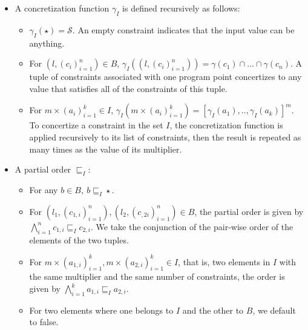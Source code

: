 \documentclass[10pt]{report}
\begin{document}
\begin{itemize}
	\item A concretization function $ \gamma_{I} $ is defined recursively as follows:
		\begin{itemize}
			\item $ \gamma_{I}(\star) = \mathcal{S}$. An empty constraint indicates that the input value can be anything. 
			
			\item For $ (l, (c_{i})_{i=1}^{n}) \in B $, $ \gamma_{I}((l, (c_{i})_{i=1}^{n})) = \gamma(c_{1}) \cap ... \cap\gamma(c_{n}) $. A tuple of constraints associated with one program point concertizes to any value that satisfies all of the constraints of this tuple.  
			
			\item For $ m \times (a_{i})_{i=1}^{k} \in I $, $ \gamma_{I}(m \times (a_{i})_{i=1}^{k}) = [\gamma_{I}(a_{1}),.., \gamma_{I}(a_{k})]^{m}$. To concertize a constraint in the set $ I $, the concretization function is applied recursively to its list of constraints, then the result is repeated as many times as the value of its multiplier. 
		\end{itemize}
	\item A partial order $ \sqsubseteq_{I} $:
	\begin{itemize}
		\item For any $ b \in B,\ b \sqsubseteq_{I} \star$. 
		\item For $(l_{1}, (c_{1,i})_{i=1}^{n}), (l_{2}, (c_{,2i})_{i=1}^{n}) \in B$, the partial order is given by $ \bigwedge\limits_{i=1}^{n} c_{1,i} \sqsubseteq_{I} c_{2,i} $. We take the conjunction of the pair-wise order of the elements of the two tuples. 
		\item For $ m \times (a_{1,i})_{i=1}^{k}, m \times (a_{2,i})_{i=1}^{k}  \in I$, that is, two elements in $ I $ with the same multiplier and the same number of constraints, the order is given by $ \bigwedge\limits_{i=1}^{k}a_{1,i} \sqsubseteq_{I} a_{2,i} $. 
		\item For two elements where one belongs to $ I $ and the other to $ B $, we default to false. 
	\end{itemize}
	

\end{itemize}
\end{document}
